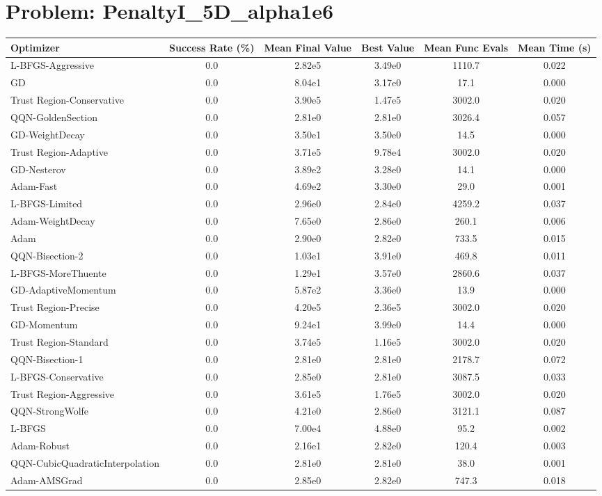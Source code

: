 \documentclass{article}
\begin{document}
\section{Problem: PenaltyI\_5D\_alpha1e6}
\begin{longtable}{p{3cm}*{5}{c}}
\toprule
\textbf{Optimizer} & \textbf{Success Rate (\%)} & \textbf{Mean Final Value} & \textbf{Best Value} & \textbf{Mean Func Evals} & \textbf{Mean Time (s)} \\
\midrule
L-BFGS-Aggressive & 0.0 & 2.82e5 & 3.49e0 & 1110.7 & 0.022 \\
GD & 0.0 & 8.04e1 & 3.17e0 & 17.1 & 0.000 \\
Trust Region-Conservative & 0.0 & 3.90e5 & 1.47e5 & 3002.0 & 0.020 \\
QQN-GoldenSection & 0.0 & 2.81e0 & 2.81e0 & 3026.4 & 0.057 \\
GD-WeightDecay & 0.0 & 3.50e1 & 3.50e0 & 14.5 & 0.000 \\
Trust Region-Adaptive & 0.0 & 3.71e5 & 9.78e4 & 3002.0 & 0.020 \\
GD-Nesterov & 0.0 & 3.89e2 & 3.28e0 & 14.1 & 0.000 \\
Adam-Fast & 0.0 & 4.69e2 & 3.30e0 & 29.0 & 0.001 \\
L-BFGS-Limited & 0.0 & 2.96e0 & 2.84e0 & 4259.2 & 0.037 \\
Adam-WeightDecay & 0.0 & 7.65e0 & 2.86e0 & 260.1 & 0.006 \\
Adam & 0.0 & 2.90e0 & 2.82e0 & 733.5 & 0.015 \\
QQN-Bisection-2 & 0.0 & 1.03e1 & 3.91e0 & 469.8 & 0.011 \\
L-BFGS-MoreThuente & 0.0 & 1.29e1 & 3.57e0 & 2860.6 & 0.037 \\
GD-AdaptiveMomentum & 0.0 & 5.87e2 & 3.36e0 & 13.9 & 0.000 \\
Trust Region-Precise & 0.0 & 4.20e5 & 2.36e5 & 3002.0 & 0.020 \\
GD-Momentum & 0.0 & 9.24e1 & 3.99e0 & 14.4 & 0.000 \\
Trust Region-Standard & 0.0 & 3.74e5 & 1.16e5 & 3002.0 & 0.020 \\
QQN-Bisection-1 & 0.0 & 2.81e0 & 2.81e0 & 2178.7 & 0.072 \\
L-BFGS-Conservative & 0.0 & 2.85e0 & 2.81e0 & 3087.5 & 0.033 \\
Trust Region-Aggressive & 0.0 & 3.61e5 & 1.76e5 & 3002.0 & 0.020 \\
QQN-StrongWolfe & 0.0 & 4.21e0 & 2.86e0 & 3121.1 & 0.087 \\
L-BFGS & 0.0 & 7.00e4 & 4.88e0 & 95.2 & 0.002 \\
Adam-Robust & 0.0 & 2.16e1 & 2.82e0 & 120.4 & 0.003 \\
QQN-CubicQuadraticInterpolation & 0.0 & 2.81e0 & 2.81e0 & 38.0 & 0.001 \\
Adam-AMSGrad & 0.0 & 2.85e0 & 2.82e0 & 747.3 & 0.018 \\
\bottomrule
\end{longtable}
\end{document}
